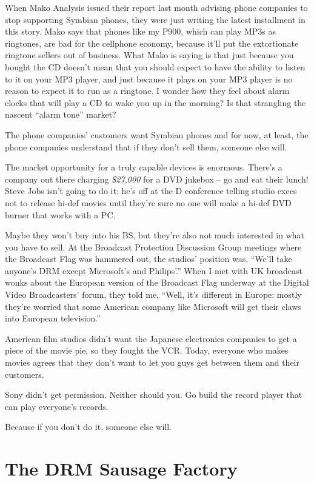 When Mako Analysis issued their report last month advising phone
companies to stop supporting Symbian phones, they were just writing
the latest installment in this story. Mako says that phones like my
P900, which can play MP3s as ringtones, are bad for the cellphone
economy, because it'll put the extortionate ringtone sellers out of
business. What Mako is saying is that just because you bought the
CD doesn't mean that you should expect to have the ability to
listen to it on your MP3 player, and just because it plays on your
MP3 player is no reason to expect it to run as a ringtone. I wonder
how they feel about alarm clocks that will play a CD to wake you up
in the morning? Is that strangling the nascent ``alarm tone''
market?

The phone companies' customers want Symbian phones and for now, at
least, the phone companies understand that if they don't sell them,
someone else will.

The market opportunity for a truly capable devices is enormous.
There's a company out there charging \emph{\$27,000} for a DVD
jukebox -- go and eat their lunch! Steve Jobs isn't going to do it:
he's off at the D conference telling studio execs not to release
hi-def movies until they're sure no one will make a hi-def DVD
burner that works with a PC.

Maybe they won't buy into his BS, but they're also not much
interested in what you have to sell. At the Broadcast Protection
Discussion Group meetings where the Broadcast Flag was hammered
out, the studios' position was, ``We'll take anyone's DRM except
Microsoft's and Philips'.'' When I met with UK broadcast wonks about
the European version of the Broadcast Flag underway at the Digital
Video Broadcasters' forum, they told me, ``Well, it's different in
Europe: mostly they're worried that some American company like
Microsoft will get their claws into European television.''

American film studios didn't want the Japanese electronics
companies to get a piece of the movie pie, so they fought the VCR.
Today, everyone who makes movies agrees that they don't want to let
you guys get between them and their customers.

Sony didn't get permission. Neither should you. Go build the record
player that can play everyone's records.

Because if you don't do it, someone else will.

\section{The DRM Sausage Factory}

